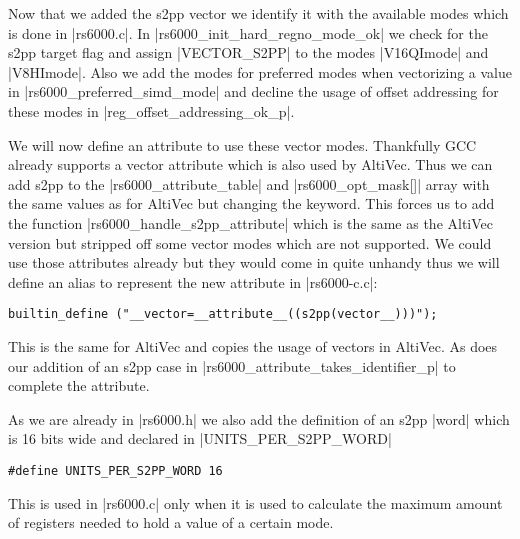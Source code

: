 Now that we added the s2pp vector we identify it with the available modes which is done in |rs6000.c|.
In |rs6000_init_hard_regno_mode_ok| we check for the s2pp target flag and assign |VECTOR_S2PP| to the modes |V16QImode| and |V8HImode|.
Also we add the modes for preferred modes when vectorizing a value in |rs6000_preferred_simd_mode| and decline the usage of offset addressing for these modes in |reg_offset_addressing_ok_p|.

We will now define an attribute to use these vector modes.
Thankfully GCC already supports a vector attribute which is also used by AltiVec.
Thus we can add s2pp to the |rs6000_attribute_table| and |rs6000_opt_mask[]| array with the same values as for AltiVec but changing the keyword.
This forces us to add the function |rs6000_handle_s2pp_attribute| which is the same as the AltiVec version but stripped off some vector modes which are not supported.
We could use those attributes already but they would come in quite unhandy thus we will define an alias to represent the new attribute in |rs6000-c.c|:
\begin{lstlisting}
builtin_define ("__vector=__attribute__((s2pp(vector__)))");
\end{lstlisting}
This is the same for AltiVec and copies the usage of vectors in AltiVec.
As does our addition of an s2pp case in |rs6000_attribute_takes_identifier_p| to complete the attribute.








As we are already in |rs6000.h| we also add the definition of an s2pp |word| which is 16 bits wide and declared in |UNITS_PER_S2PP_WORD|
\begin{lstlisting}
#define UNITS_PER_S2PP_WORD 16
\end{lstlisting} 
This is used in |rs6000.c| only when it is used to calculate the maximum amount of registers needed to hold a value of a certain mode.  



